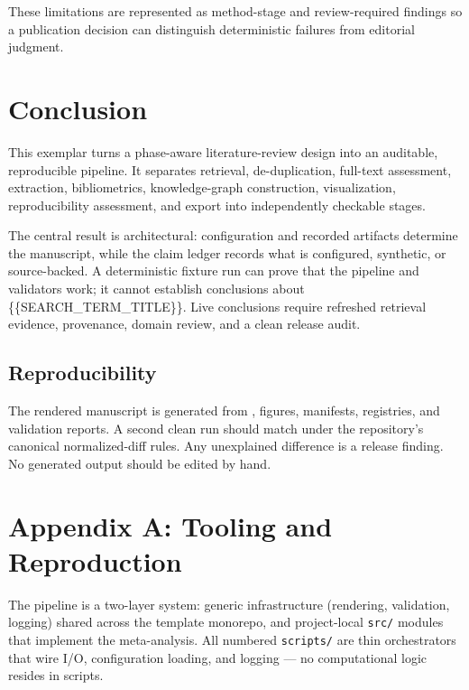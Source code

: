 \documentclass[
]{article}
\begin{document}
These limitations are represented as method-stage and review-required
findings so a publication decision can distinguish deterministic
failures from editorial judgment.

\newpage

\section{Conclusion}\label{conclusion}

This exemplar turns a phase-aware literature-review design into an
auditable, reproducible pipeline. It separates retrieval,
de-duplication, full-text assessment, extraction, bibliometrics,
knowledge-graph construction, visualization, reproducibility assessment,
and export into independently checkable stages.

The central result is architectural: configuration and recorded
artifacts determine the manuscript, while the claim ledger records what
is configured, synthetic, or source-backed. A deterministic fixture run
can prove that the pipeline and validators work; it cannot establish
conclusions about \{\{SEARCH\_TERM\_TITLE\}\}. Live conclusions require
refreshed retrieval evidence, provenance, domain review, and a clean
release audit.

\subsection{Reproducibility}\label{reproducibility}

The rendered manuscript is generated from ,
figures, manifests, registries, and validation reports. A second clean
run should match under the repository's canonical normalized-diff rules.
Any unexplained difference is a release finding. No generated output
should be edited by hand.

\newpage

\section{Appendix A: Tooling and
Reproduction}\label{appendix-a-tooling-and-reproduction}

The pipeline is a two-layer system: generic infrastructure (rendering,
validation, logging) shared across the template monorepo, and
project-local \texttt{src/} modules that implement the meta-analysis.
All numbered \texttt{scripts/} are thin orchestrators that wire I/O,
configuration loading, and logging --- no computational logic resides in
scripts.
\end{document}
